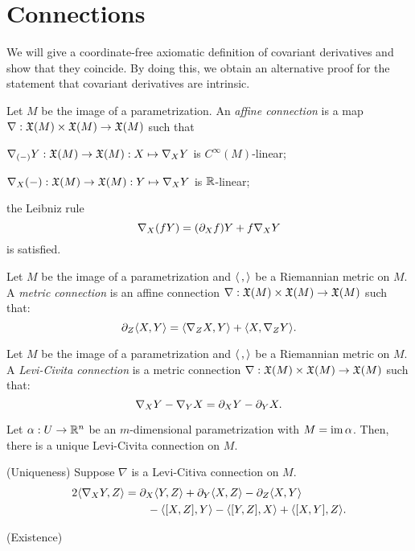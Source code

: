 \documentclass{../note}
\def\a{\alpha}
\begin{document}
\section{Connections}

We will give a coordinate-free axiomatic definition of covariant derivatives and show that they coincide.
By doing this, we obtain an alternative proof for the statement that covariant derivatives are intrinsic.

\begin{defn}
Let $M$ be the image of a parametrization.
An \emph{affine connection} is a map $\nabla:\mathfrak{X}(M)\times\mathfrak{X}(M)\to\mathfrak{X}(M)$ such that
\begin{parts}
\item $\nabla_{(-)}Y:\mathfrak{X}(M)\to\mathfrak{X}(M):X\mapsto\nabla_XY$ is $C^\infty(M)$-linear;
\item $\nabla_X(-):\mathfrak{X}(M)\to\mathfrak{X}(M):Y\mapsto\nabla_XY$ is $\mathbb{R}$-linear;
\item the Leibniz rule
\[\nabla_X(fY)=(\pd_Xf)Y+f\nabla_XY\]
is satisfied.
\end{parts}
\end{defn}

\begin{defn}
Let $M$ be the image of a parametrization and $\langle\,,\rangle$ be a Riemannian metric on $M$.
A \emph{metric connection} is an affine connection $\nabla:\mathfrak{X}(M)\times\mathfrak{X}(M)\to\mathfrak{X}(M)$ such that:
\[\pd_Z\<X,Y\>=\<\nabla_ZX,Y\>+\<X,\nabla_ZY\>.\]
\end{defn}

\begin{defn}
Let $M$ be the image of a parametrization and $\langle\,,\rangle$ be a Riemannian metric on $M$.
A \emph{Levi-Civita connection} is a metric connection $\nabla:\mathfrak{X}(M)\times\mathfrak{X}(M)\to\mathfrak{X}(M)$ such that:
\[\nabla_XY-\nabla_YX=\pd_XY-\pd_YX.\]
\end{defn}

\begin{thm}
Let $\a:U\to\R^n$ be an $m$-dimensional parametrization with $M=\im\a$.
Then, there is a unique Levi-Civita connection on $M$.
\end{thm}
\begin{pf}
(Uniqueness)
Suppose $\nabla$ is a Levi-Citiva connection on $M$.
\begin{align*}
2\<\nabla_XY,Z\>&=\pd_X\<Y,Z\>+\pd_Y\<X,Z\>-\pd_Z\<X,Y\>\\
&\qquad-\<[X,Z],Y\>-\<[Y,Z],X\>+\<[X,Y],Z\>.
\end{align*}

(Existence)
\end{pf}
\end{document}
